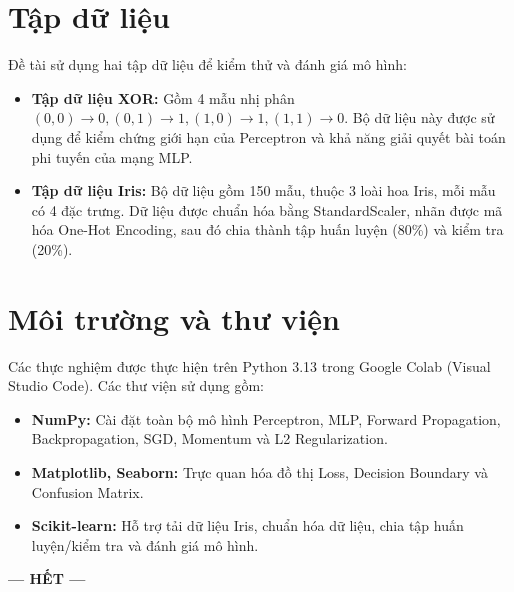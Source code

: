\documentclass[12pt,a4paper]{report}
\begin{document}
\section{Tập dữ liệu}
Đề tài sử dụng hai tập dữ liệu để kiểm thử và đánh giá mô hình:
\begin{itemize}
    \item \textbf{Tập dữ liệu XOR:} Gồm 4 mẫu nhị phân $(0,0) \rightarrow 0, (0,1) \rightarrow 1, (1,0) \rightarrow 1, (1,1) \rightarrow 0$. Bộ dữ liệu này được sử dụng để kiểm chứng giới hạn của Perceptron và khả năng giải quyết bài toán phi tuyến của mạng MLP.
    \item \textbf{Tập dữ liệu Iris:} Bộ dữ liệu gồm 150 mẫu, thuộc 3 loài hoa Iris, mỗi mẫu có 4 đặc trưng. Dữ liệu được chuẩn hóa bằng StandardScaler, nhãn được mã hóa One-Hot Encoding, sau đó chia thành tập huấn luyện (80\%) và kiểm tra (20\%).
\end{itemize}

\section{Môi trường và thư viện}
Các thực nghiệm được thực hiện trên Python 3.13 trong Google Colab (Visual Studio Code).
Các thư viện sử dụng gồm:
\begin{itemize}
    \item \textbf{NumPy:} Cài đặt toàn bộ mô hình Perceptron, MLP, Forward Propagation, Backpropagation, SGD, Momentum và L2 Regularization.
    \item \textbf{Matplotlib, Seaborn:} Trực quan hóa đồ thị Loss, Decision Boundary và Confusion Matrix.
    \item \textbf{Scikit-learn:} Hỗ trợ tải dữ liệu Iris, chuẩn hóa dữ liệu, chia tập huấn luyện/kiểm tra và đánh giá mô hình.
\end{itemize}

\begin{center}
    \vspace{1cm}
    \textbf{--- HẾT ---}
\end{center}
\end{document}
